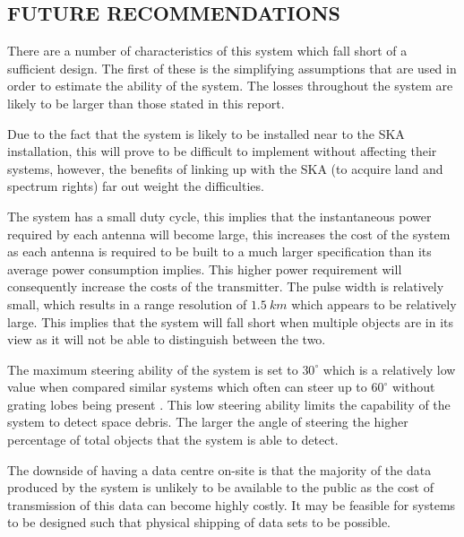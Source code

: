 \documentclass[11pt]{witseiepaper}
\begin{document}
\begin{bibunit}[witseie]


\newpage

\section{FUTURE RECOMMENDATIONS} \label{sec:FutureRecommendations}
There are a number of characteristics of this system which fall short of a sufficient design.
The first of these is the simplifying assumptions that are used in order to estimate the ability of the system. The losses throughout the system are likely to be larger than those stated in this report. 

Due to the fact that the system is likely to be installed near to the SKA installation, this will prove to be difficult to implement without affecting their systems, however, the benefits of linking up with the SKA (to acquire land and spectrum rights) far out weight the difficulties.

The system has a small duty cycle, this implies that the instantaneous power required by each antenna will become large, this increases the cost of the system as each antenna is required to be built to a much larger specification than its average power consumption implies. This higher power requirement will consequently increase the costs of the transmitter.
The pulse width is relatively small, which results in a range resolution of $1.5~km$ which appears to be relatively large. This implies that the system will fall short when multiple objects are in its view as it will not be able to distinguish between the two.

The maximum steering ability of the system is set to $30^{\circ}$ which is a relatively low value when compared similar systems which often can steer up to $60^{\circ}$ without grating lobes being present \cite{maxAngle}. This low steering ability limits the capability of the system to detect space debris. The larger the angle of steering the higher percentage of total objects that the system is able to detect.

The downside of having a data centre on-site is that the majority of the data produced by the system is unlikely to be available to the public as the cost of transmission of this data can become highly costly. It may be feasible for systems to be designed such that physical shipping of data sets to be possible. 


\end{bibunit}
\end{document}
